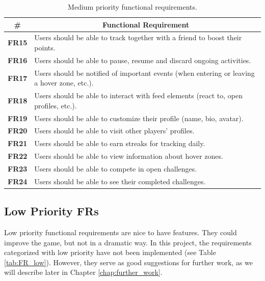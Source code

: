 \begin{table}[H]
    \centering
    \begin{tabularx}{\textwidth}{|>{\small}c|X|}
        \hline
        \textbf{\#} & \multicolumn{1}{c|}{\textbf{Functional Requirement}} \\ \hline
        \textbf{FR15} & Users should be able to track together with a friend to boost their points. \\ 
        \textbf{FR16} & Users should be able to pause, resume and discard ongoing activities.\\
        \textbf{FR17} & Users should be notified of important events (when entering or leaving a hover zone, etc.). \\
        \textbf{FR18} & Users should be able to interact with feed elements (react to, open profiles, etc.). \\
        \textbf{FR19} & Users should be able to customize their profile (name, bio, avatar). \\
        \textbf{FR20} & Users should be able to visit other players’ profiles. \\
        \textbf{FR21} & Users should be able to earn streaks for tracking daily. \\
        \textbf{FR22} & Users should be able to view information about hover zones. \\
        \textbf{FR23} & Users should be able to compete in open challenges.\\
        \textbf{FR24} & Users should be able to see their completed challenges. \\ \hline
    \end{tabularx}
    \caption{Medium priority functional requirements.}
    \label{tab:FR_medium}
    \vspace*{-\baselineskip}
\end{table}

\subsection{Low Priority FRs}
Low priority functional requirements are nice to have features. They could improve the game, but not in a dramatic way. In this project, the requirements categorized with low priority have not been implemented (see Table \ref{tab:FR_low}). However, they serve as good suggestions for further work, as we will describe later in Chapter \ref{chap:further_work}. 

